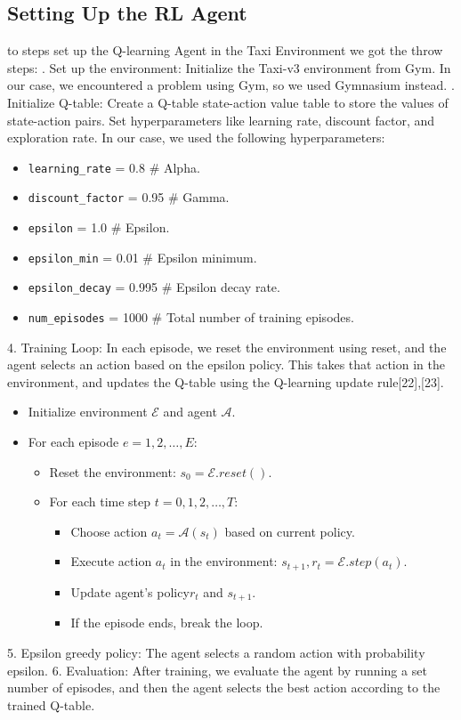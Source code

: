 \subsection{Setting Up the RL Agent}
to steps set up the Q-learning Agent in the Taxi Environment we got the throw steps:
. Set up the environment: Initialize the Taxi-v3 environment from Gym. In our case, we encountered a problem using Gym, so we used Gymnasium instead.
. Initialize Q-table: Create a Q-table state-action value table to store the values of state-action pairs.
\newline 
Set hyperparameters like learning rate, discount factor, and exploration rate. In our case, we used the following hyperparameters:
\begin{itemize}
    \item \texttt{learning\_rate} = 0.8 \quad \# Alpha.
    \item \texttt{discount\_factor} = 0.95 \quad \# Gamma.
    \item \texttt{epsilon} = 1.0 \quad \# Epsilon.
    \item \texttt{epsilon\_min} = 0.01 \quad \# Epsilon minimum.
    \item \texttt{epsilon\_decay} = 0.995 \quad \# Epsilon decay rate.
    \item \texttt{num\_episodes} = 1000 \quad \# Total number of training episodes.    
\end{itemize}
4. Training Loop: In each episode, we reset the environment using reset, and the agent selects an action based on the epsilon policy. This takes that action in the environment, and updates the Q-table using the Q-learning update rule[22],[23].

\begin{itemize}
    \item Initialize environment \(\mathcal{E}\) and agent \(\mathcal{A}\).
    \item For each episode \(e = 1, 2, \dots, E\):
    \begin{itemize}
        \item Reset the environment: \(s_0 = \mathcal{E}.reset()\).
        \item For each time step \(t = 0, 1, 2, \dots, T\):
        \begin{itemize}
            \item Choose action \(a_t = \mathcal{A}(s_t)\) based on current policy.
            \item Execute action \(a_t\) in the environment: \(s_{t+1}, r_t = \mathcal{E}.step(a_t)\).
            \item Update agent's policy\(r_t\) and \(s_{t+1}\).
            \item If the episode ends, break the loop.
        \end{itemize}
    \end{itemize}
\end{itemize}
5. Epsilon greedy policy: The agent selects a random action with probability epsilon. 
6. Evaluation: After training, we evaluate the agent by running a set number of episodes, and then the agent selects the best action according to the trained Q-table.
